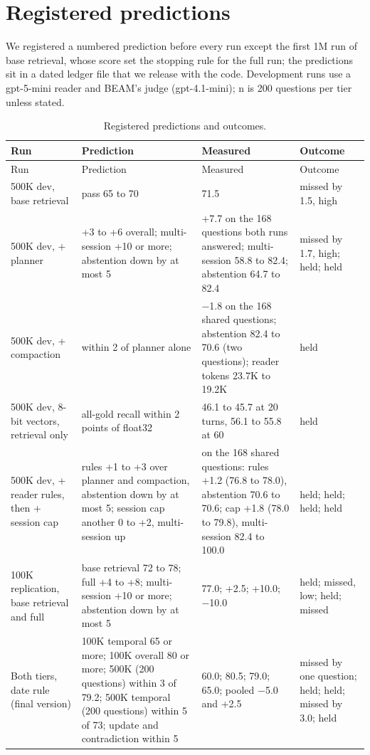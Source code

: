 \section{Registered predictions}
\label{app:predictions}

We registered a numbered prediction before every run except the first 1M run of base retrieval, whose score set the stopping rule for the full run; the predictions sit in a dated ledger file that we release with the code. Development runs use a gpt-5-mini reader and BEAM's judge (gpt-4.1-mini); n is 200 questions per tier unless stated.

{\small
\begin{longtable}{@{}L{40mm}L{56mm}L{30mm}L{24mm}@{}}
\caption{Registered predictions and outcomes.}\label{tab:predictions}\\
\toprule
Run & Prediction & Measured & Outcome \\
\midrule
\endfirsthead
\toprule
Run & Prediction & Measured & Outcome \\
\midrule
\endhead
\bottomrule
\endfoot
500K dev, base retrieval & pass 65 to 70 & 71.5 & missed by 1.5, high \\
500K dev, + planner & +3 to +6 overall; multi-session +10 or more; abstention down by at most 5 & +7.7 on the 168 questions both runs answered; multi-session 58.8 to 82.4; abstention 64.7 to 82.4 & missed by 1.7, high; held; held \\
500K dev, + compaction & within 2 of planner alone & $-$1.8 on the 168 shared questions; abstention 82.4 to 70.6 (two questions); reader tokens 23.7K to 19.2K & held \\
500K dev, 8-bit vectors, retrieval only & all-gold recall within 2 points of float32 & 46.1 to 45.7 at 20 turns, 56.1 to 55.8 at 60 & held \\
500K dev, + reader rules, then + session cap & rules +1 to +3 over planner and compaction, abstention down by at most 5; session cap another 0 to +2, multi-session up & on the 168 shared questions: rules +1.2 (76.8 to 78.0), abstention 70.6 to 70.6; cap +1.8 (78.0 to 79.8), multi-session 82.4 to 100.0 & held; held; held; held \\
100K replication, base retrieval and full & base retrieval 72 to 78; full +4 to +8; multi-session +10 or more; abstention down by at most 5 & 77.0; +2.5; +10.0; $-$10.0 & held; missed, low; held; missed \\
Both tiers, date rule (final version) & 100K temporal 65 or more; 100K overall 80 or more; 500K (200 questions) within 3 of 79.2; 500K temporal (200 questions) within 5 of 73; update and contradiction within 5 & 60.0; 80.5; 79.0; 65.0; pooled $-$5.0 and +2.5 & missed by one question; held; held; missed by 3.0; held \\

\end{longtable}}

